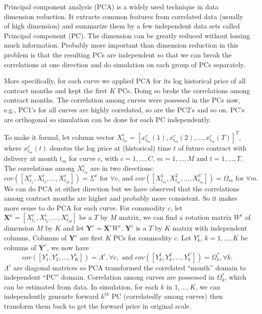 \documentclass[12pt]{article}
\begin{document}
Principal component analysis (PCA) is a widely used technique 
in data dimension reduction. It extracts common features from 
correlated data (usually of high dimension) and summarize them
by a few independent data sets called Principal component (PC). 
The dimension can be greatly reduced without lossing much 
information. Probably more important than dimension reduction
in this problem is that
the resulting PCs are independent so that we can break the 
correlations at one direction and do simulation on each group of PCs
separately. 

More specifically, for each curve we applied PCA for its log 
historical price of all contract months and kept the first $K$ 
PCs. Doing so broke the correlations among 
contract months. The correlation among curves were posessed 
in the PCs now, e.g., PC1's for all curves are highly correlated,
so are the PC2's and so on. PC's are orthogonal so 
simulation can be done for each PC independently.
 
To make it formal, let column vector 
$X^c_{t_m}=[x^c_{t_m}(1), x^c_{t_m}(2), \ldots, x^c_{t_m}(T)]^T$, where
$x^c_{t_m}(t)$ denotes the log price at (historical) time
$t$ of future contract with delivery at month $t_m$ for curve $c$,
with $c=1, \ldots, C$, $m=1, \ldots, M$ and $t=1, \ldots, T$. 
The correlations among $X^c_{t_m}$ are in two directions:
\[cov([X^c_{t_1},X^c_{t_2}, \ldots, X^c_{t_M}])=\Sigma^c \mbox{ for }\forall c
\mbox{, and } 
cov([X^1_{t_m}, X^2_{t_m},\ldots, X^C_{t_m}])=\Omega_m \mbox{ for } \forall m. \]
We can do PCA at either direction but we 
have observed that the correlations
among contract months are higher and probably more consistent. 
So it makes more sense to do PCA for each curve. For commodity $c$,
let $\mathbf{X^c}=[X^c_{t_1},X^c_{t_2}, \ldots, X^c_{t_M}]$ be a 
$T$ by $M$ matrix, we can find a rotation matrix $W^c$ of
dimension $M$ by $K$ and let $\mathbf{Y}^c=\mathbf{X}^cW^c$. 
$\mathbf{Y}^c$ is a $T$ by $K$ matrix with independent columns, 
Columns of $\mathbf{Y}^c$ are first $K$ PCs for commodity $c$. 
Let $Y_k^c$, $k=1,\ldots, K$ be columns of $\mathbf{Y}^c$, 
we now have 
\[cov([Y^c_1,Y^c_2, \ldots, Y^c_K])=\Lambda^c,\forall c,
\mbox{ and } cov([Y^1_k,Y^2_k, \ldots, Y^C_k])=\Omega_k^*, \forall k. \]
$\Lambda^c$ are diagonal matrices so PCA transformed the 
correlated ``month'' domain to independent ``PC'' domain. 
Correlation among curves are possessed in $\Omega_k^*$, 
which can be estimated from data. 
In simulation, for each $k$ in $1, \ldots, K$, 
we can independently genearte forward $k^{th}$ PC
(correlatedly among curves) then transform them 
back to get the forward price in original scale.
\end{document}
